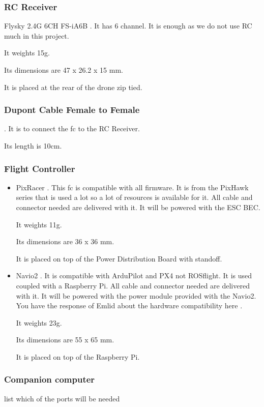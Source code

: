 \subsubsection{RC Receiver}
Flysky 2.4G 6CH FS-iA6B \cite{bangood_receiver}. It has 6 channel. It is enough as we do not use RC much in this project.

It weights 15g.

Its dimensions are 47 x 26.2 x 15 mm.

It is placed at the rear of the drone zip tied.

\subsubsection{Dupont Cable Female to Female}
\cite{bangood_dupont_cable}. It is to connect the \gls{fc} to the RC Receiver.

Its length is 10cm.

\subsubsection{Flight Controller}
\begin{itemize}
    \item PixRacer \cite{mrobotics_pixracer}. This \gls{fc} is compatible with all firmware. It is from the PixHawk series that is used a lot so a lot of resources is available for it. All cable and connector needed are delivered with it. It will be powered with the ESC BEC.

          It weights 11g.

          Its dimensions are 36 x 36 mm.

          It is placed on top of the Power Distribution Board with standoff.

    \item Navio2 \cite{emlid_navio2}. It is compatible with ArduPilot and PX4 not ROSflight. It is used coupled with a Raspberry Pi. All cable and connector needed are delivered with it. It will be powered with the power module \cite{emlid_power_module} provided with the Navio2. You have the response of Emlid about the hardware compatibility here \cite{emlid_rpi_compatibility}.

          It weights 23g.

          Its dimensions are 55 x 65 mm.

          It is placed on top of the Raspberry Pi.
\end{itemize}

\subsubsection{Companion computer}
list which of the ports will be needed

